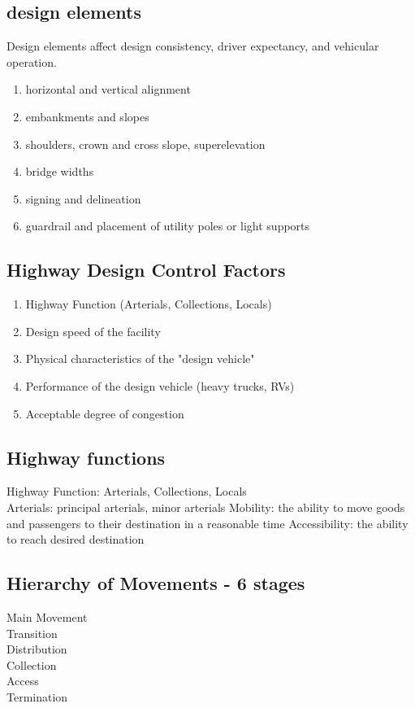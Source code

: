\documentclass{article}
\begin{document}
  \subsection{design elements}
  Design elements affect design consistency, driver expectancy, and vehicular operation.
  \begin{enumerate}
    \item horizontal and vertical alignment
    \item embankments and slopes
    \item shoulders, crown and cross slope, superelevation
    \item bridge widths
    \item signing and delineation
    \item guardrail and placement of utility poles or light supports
  \end{enumerate}

  \subsection{Highway Design Control Factors}
  \begin{enumerate}
    \item Highway Function (Arterials, Collections, Locals)
    \item Design speed of the facility
    \item Physical characteristics of the "design vehicle" 
    \item Performance of the design vehicle (heavy trucks, RVs)
    \item Acceptable degree of congestion
  \end{enumerate}

  \subsection{Highway functions}
    Highway Function: Arterials, Collections, Locals \\
    Arterials: principal arterials, minor arterials
    Mobility: the ability to move goods and passengers to their destination in a reasonable time 
    Accessibility: the ability to reach desired destination

  \subsection{Hierarchy of Movements - 6 stages}
  Main Movement \\
  Transition \\
  Distribution \\
  Collection \\
  Access \\
  Termination \\
\end{document}
